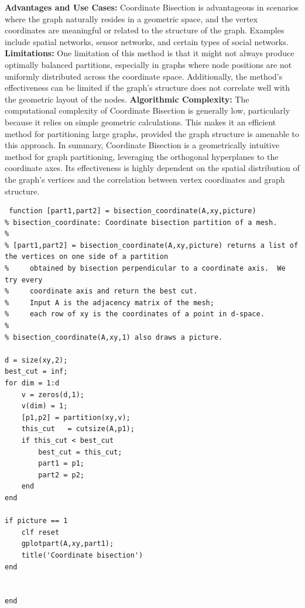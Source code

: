 \documentclass[unicode,11pt,a4paper,oneside,numbers=endperiod,openany]{scrartcl}
\begin{document}
\textbf{Advantages and Use Cases:}
Coordinate Bisection is advantageous in scenarios where the graph naturally resides in a geometric space, and the vertex coordinates are meaningful or related to the structure of the graph. Examples include spatial networks, sensor networks, and certain types of social networks.
\newline \newline
\textbf{Limitations:}
One limitation of this method is that it might not always produce optimally balanced partitions, especially in graphs where node positions are not uniformly distributed across the coordinate space. Additionally, the method's effectiveness can be limited if the graph's structure does not correlate well with the geometric layout of the nodes.
\newline \newline
\textbf{Algorithmic Complexity:}
The computational complexity of Coordinate Bisection is generally low, particularly because it relies on simple geometric calculations. This makes it an efficient method for partitioning large graphs, provided the graph structure is amenable to this approach.
\newline
In summary, Coordinate Bisection is a geometrically intuitive method for graph partitioning, leveraging the orthogonal hyperplanes to the coordinate axes. Its effectiveness is highly dependent on the spatial distribution of the graph's vertices and the correlation between vertex coordinates and graph structure.


\begin{lstlisting}
 function [part1,part2] = bisection_coordinate(A,xy,picture)
% bisection_coordinate: Coordinate bisection partition of a mesh.
%
% [part1,part2] = bisection_coordinate(A,xy,picture) returns a list of the vertices on one side of a partition
%     obtained by bisection perpendicular to a coordinate axis.  We try every
%     coordinate axis and return the best cut.
%     Input A is the adjacency matrix of the mesh;
%     each row of xy is the coordinates of a point in d-space.
%
% bisection_coordinate(A,xy,1) also draws a picture.

d = size(xy,2);
best_cut = inf;
for dim = 1:d
    v = zeros(d,1);
    v(dim) = 1;
    [p1,p2] = partition(xy,v);
    this_cut   = cutsize(A,p1);
    if this_cut < best_cut
        best_cut = this_cut;
        part1 = p1;
        part2 = p2;
    end
end

if picture == 1
    clf reset
    gplotpart(A,xy,part1);
    title('Coordinate bisection')
end


end
\end{lstlisting}
\end{document}
